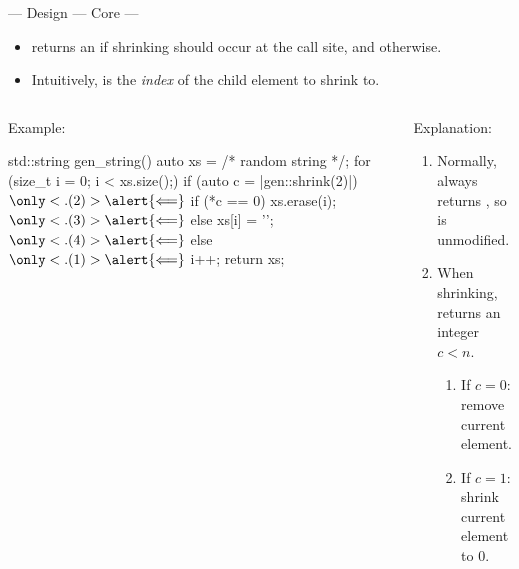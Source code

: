\begin{frame}[fragile,t]{\halcheck{} --- Design --- Core --- }
  \begin{center}
  \end{center}

  \begin{overprint}
    \onslide<+>
    \begin{itemize}
      \item {} returns an  if shrinking should occur at the call site, and  otherwise.
      \item Intuitively,  is the \emph{index} of the child element to shrink to.
    \end{itemize}

    \onslide<+->
    \begin{columns}[T]
      \begin{block}{Example:}
        \begin{cppcode}
          std::string gen_string() {
            auto xs = /* random string */;
            for (size_t i = 0; i < xs.size();)
              if (auto c = |\alert{gen::shrink}(2)|) $\only<.(2)>{\alert{\Longleftarrow}}$
                if (*c == 0) xs.erase(i); $\only<.(3)>{\alert{\Longleftarrow}}$
                else         xs[i] = '\0'; $\only<.(4)>{\alert{\Longleftarrow}}$
              else $\only<.(1)>{\alert{\Longleftarrow}}$
                i++;
            return xs; }
        \end{cppcode}
      \end{block}

      \begin{block}{Explanation:}
        \begin{enumerate}
          \item<+-|alert@+> Normally,  always returns , so  is unmodified.
          \item<+-|alert@+> When shrinking,  returns an integer $c < n$.
            \begin{enumerate}
              \item<+-|alert@+> If $c = 0$: remove current element.
              \item<+-|alert@+> If $c = 1$: shrink current element to 0.
            \end{enumerate}
        \end{enumerate}
      \end{block}
    \end{columns}
  \end{overprint}
\end{frame}

